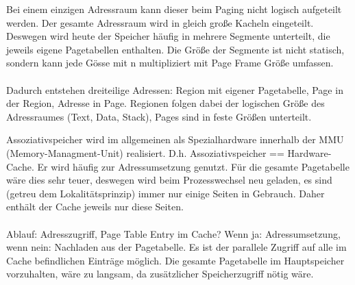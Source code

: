 \begin{answer}
  Bei einem einzigen Adressraum kann dieser beim Paging nicht logisch aufgeteilt werden. Der gesamte Adressraum wird in gleich große Kacheln eingeteilt.
  Deswegen wird heute der Speicher häufig in mehrere Segmente unterteilt, die jeweils eigene Pagetabellen enthalten. Die Größe der Segmente ist nicht statisch, sondern kann jede Gösse mit n multipliziert mit Page Frame Größe umfassen.

  \paragraph*{}
  Dadurch entstehen dreiteilige Adressen:
  Region mit eigener Pagetabelle, Page in der Region, Adresse in Page.
  Regionen folgen dabei der logischen Größe des Adressraumes (Text, Data, Stack), Pages sind in feste Größen unterteilt.
\end{answer}

\begin{answer}
  Assoziativspeicher wird im allgemeinen als Spezialhardware innerhalb der MMU (Memory-Managment-Unit) realisiert. D.h. Assoziativspeicher == Hardware-Cache.
  Er wird häufig zur Adressumsetzung genutzt. Für die gesamte Pagetabelle wäre dies sehr teuer, deswegen wird beim Prozesswechsel neu geladen, es sind (getreu dem Lokalitätsprinzip) immer nur einige Seiten in Gebrauch. Daher enthält der Cache jeweils nur diese Seiten.

  \paragraph*{}
  Ablauf: Adresszugriff,
  Page Table Entry im Cache? Wenn ja: Adressumsetzung, wenn nein: Nachladen aus der Pagetabelle.
  Es ist der parallele Zugriff auf alle im Cache befindlichen Einträge möglich. Die gesamte Pagetabelle im Hauptspeicher vorzuhalten, wäre zu langsam, da zusätzlicher Speicherzugriff nötig wäre.
\end{answer}

